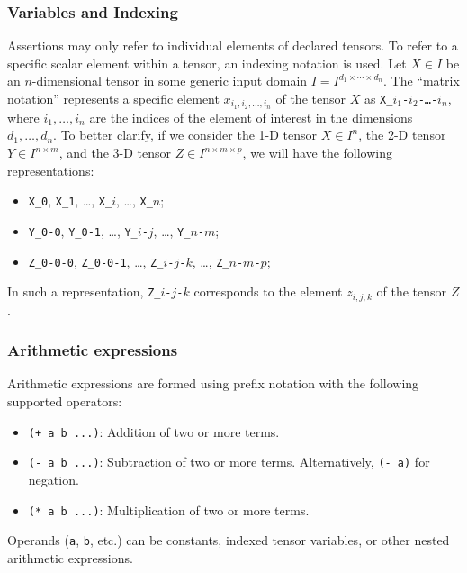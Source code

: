 \subsubsection*{Variables and Indexing}
Assertions may only refer to individual elements of declared tensors. To refer to a specific scalar element within a tensor, an indexing notation is used. Let $X \in I$ be an $n$-dimensional tensor 
in some generic input domain $I = I^{d_1 \times \cdots \times d_n}$. The ``matrix notation'' represents a specific element $x_{i_1, i_2, \dots, i_n}$ of the tensor $X$ as \texttt{X\_$i_1$-$i_2$-\dots-$i_n$}, 
where $i_1, \dots, i_n$ are the indices of the element of interest in the dimensions $d_1, \dots, d_n$. To better clarify, if we consider the 1-D tensor $X \in I^n$, the 2-D tensor 
$Y \in I^{n \times m}$, and the 3-D tensor $Z \in I^{n \times m \times p}$, we will have the following representations:
\begin{itemize}
    \item \texttt{X\_0}, \texttt{X\_1}, \dots, \texttt{X\_$i$}, \dots, \texttt{X\_$n$};
    \item \texttt{Y\_0-0}, \texttt{Y\_0-1}, \dots, \texttt{Y\_$i$-$j$}, \dots, \texttt{Y\_$n$-$m$};
    \item \texttt{Z\_0-0-0}, \texttt{Z\_0-0-1}, \dots, \texttt{Z\_$i$-$j$-$k$}, \dots, \texttt{Z\_$n$-$m$-$p$};
\end{itemize}
In such a representation, \texttt{Z\_$i$-$j$-$k$} corresponds to the element $z_{i,j,k}$ of the tensor $Z$. 

\subsubsection*{Arithmetic expressions}
Arithmetic expressions are formed using prefix notation with the following supported operators:
\begin{itemize}
    \item \texttt{(+ a b ...)}: Addition of two or more terms. 
    \item \texttt{(- a b ...)}: Subtraction of two or more terms. Alternatively, \texttt{(- a)} for negation.
    \item \texttt{(* a b ...)}: Multiplication of two or more terms. 
\end{itemize}
Operands (\texttt{a}, \texttt{b}, etc.) can be constants, indexed tensor variables, or other nested arithmetic expressions.


